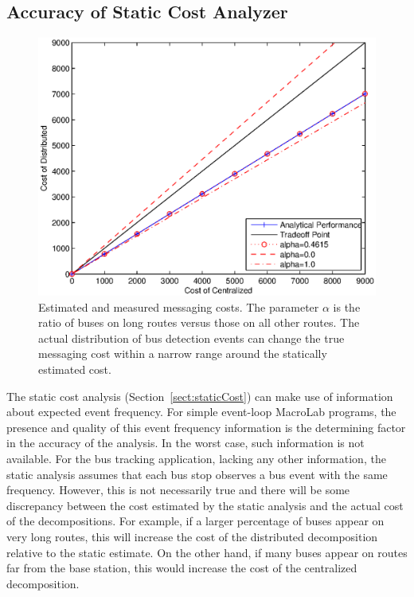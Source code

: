 \subsection{Accuracy of Static Cost Analyzer}
\label{sect:analysisAccuracy}
\begin{figure}
  \centering
  \includegraphics[width=0.6\columnwidth]{fig/Buses}
  \caption[Estimated and measured messaging costs]{Estimated and measured
  messaging costs. The parameter $\alpha$ is the ratio of buses on long routes
  versus those on all other routes. The actual distribution of bus detection
  events can change the true messaging cost within a narrow range around the
  statically estimated cost.  }
  \label{fig:Buses}
\end{figure}

The static cost analysis (Section~\ref{sect:staticCost}) can make
use of information about expected event frequency. For simple event-loop
MacroLab programs, the presence and quality of this event frequency
information is the determining factor in the accuracy of the analysis.
In the worst case, such information is not available. For the bus
tracking application, lacking any other information, the static analysis
assumes that each bus stop observes a bus event with the same frequency.
However, this is not necessarily true and there will be some
discrepancy between the cost estimated by the static analysis and the
actual cost of the decompositions. For example, if a larger percentage
of buses appear on very long routes, this will increase the cost of the
distributed decomposition relative to the static estimate. On the other
hand, if many buses appear on routes far from the base
station, this would increase the cost of the centralized decomposition.

